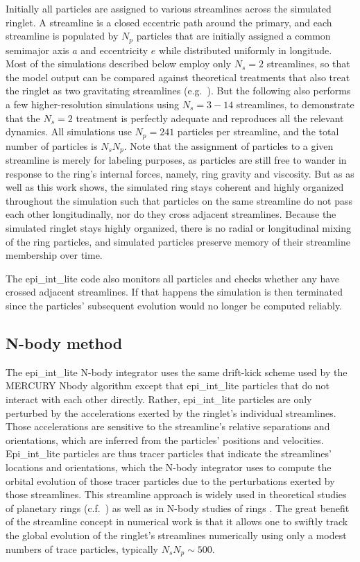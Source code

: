 \documentclass[preprint]{aastex62}
\begin{document}
Initially all particles are assigned to various streamlines across the simulated ringlet. A streamline
is a closed eccentric path around the primary, and each streamline is populated by $N_p$ particles that are
initially assigned a common semimajor axis $a$ and eccentricity $e$ while
distributed uniformly in longitude. Most of the simulations described below
employ only $N_s=2$ streamlines, so that the model output can be compared against
theoretical treatments that also treat the ringlet as two gravitating streamlines
(e.g.\ \citealt{BGT83}). But the following also performs a few higher-resolution simulations
using $N_s=3-14$ streamlines, to demonstrate that the $N_s=2$ treatment is perfectly
adequate and reproduces all the relevant dynamics. All simulations use $N_p=241$ particles 
per streamline, and the total number of particles is $N_sN_p$.
Note that the assignment of particles to a given streamline is merely
for labeling purposes, as particles are still free to wander in response
to the ring’s internal forces, namely, ring gravity and viscosity. But as \cite{HS13} as well
as this work shows, the simulated ring stays coherent and highly organized throughout the 
simulation such that particles on the same streamline do not pass each other longitudinally,
nor do they cross adjacent streamlines. Because the simulated ringlet stays highly organized,
there is no radial or longitudinal mixing of the ring particles, and simulated particles preserve
memory of their streamline membership over time. 

The epi\_int\_lite code also monitors all particles and checks whether any have crossed adjacent streamlines.
If that happens the simulation is then terminated since the particles' subsequent evolution
would no longer be computed reliably.

\subsection{N-body method}
\label{subsec:N-body method}

The epi\_int\_lite N-body integrator uses the same drift-kick
scheme used by the MERCURY Nbody algorithm \citep{C99} except that
epi\_int\_lite particles that do not interact with each other directly.
Rather, epi\_int\_lite particles
are only perturbed by the accelerations exerted by the ringlet's individual streamlines. 
Those accelerations are sensitive to the streamline's relative separations and orientations, 
which are inferred from the particles' positions
and velocities. Epi\_int\_lite particles are thus tracer particles
that indicate the streamlines' locations and orientations, which the N-body
integrator uses to compute the orbital evolution of those tracer particles
due to the perturbations exerted by those streamlines. This streamline approach 
is widely used in theoretical studies of planetary rings (c.f.\ \citealt{GT79, BGT83, BGT85})
as well as in N-body studies of rings \citep{HS13, RHH16}. The great benefit of the streamline concept
in numerical work is that it allows one to swiftly track the 
global evolution of the ringlet's streamlines numerically
using only a modest numbers of trace particles, typically $N_sN_p\sim500$.
\end{document}

